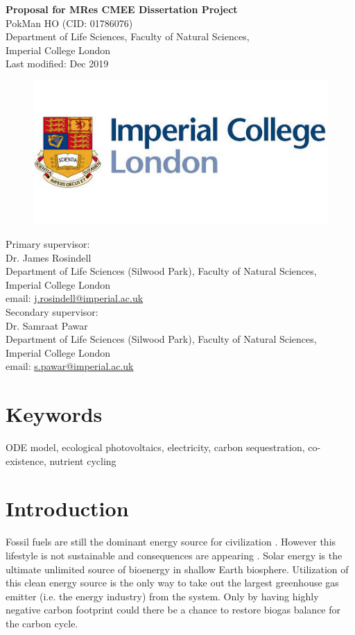 \documentclass[a4paper, 11pt]{article}
\title{\ReportTitle}
\author{\ReportAuthor}
\date{}
\newcommand{\ReportTitle}{Proposal for MRes CMEE Dissertation Project}
\newcommand{\ReportAuthor}{PokMan HO (CID: 01786076)}
\newcommand{\ReportAffil}{Department of Life Sciences, Faculty of Natural Sciences,\\Imperial College London}
\begin{document}
	\begin{center}
		\Huge\textbf{\ReportTitle}\\
		\LARGE\ReportAuthor\\
		\Large\ReportAffil\\
		\Large{Last modified: Dec 2019}
	\end{center}
	\begin{figure}[h]
		\centering\includegraphics[width=\linewidth]{icl.jpg}
	\end{figure}
Primary supervisor:\\
\indent Dr. James Rosindell\\
\indent Department of Life Sciences (Silwood Park), Faculty of Natural Sciences, Imperial College London\\
\indent email: \href{mailto:j.rosindell@imperial.ac.uk}{j.rosindell@imperial.ac.uk}\\
Secondary supervisor:\\
\indent Dr. Samraat Pawar\\
\indent Department of Life Sciences (Silwood Park), Faculty of Natural Sciences, Imperial College London\\
\indent email: \href{mailto:s.pawar@imperial.ac.uk}{s.pawar@imperial.ac.uk}
\clearpage
\section{Keywords}
ODE model, ecological photovoltaics, electricity, carbon sequestration, co-existence, nutrient cycling
\section{Introduction}
Fossil fuels are still the dominant energy source for civilization \autocite{yang2008progress,ferguson2000electricity}.  However this lifestyle is not sustainable and consequences are appearing \autocite{schuur2015climate}.  Solar energy is the ultimate unlimited source of bioenergy in shallow Earth biosphere.  Utilization of this clean energy source is the only way to take out the largest greenhouse gas emitter (i.e. the energy industry) from the system.  Only by having highly negative carbon footprint could there be a chance to restore biogas balance for the carbon cycle.\\
\end{document}
